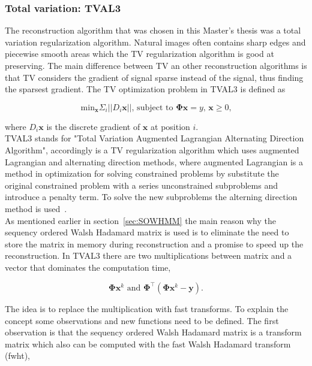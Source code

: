 \subsubsection{Total variation: TVAL3}
\label{sec:TV}
The reconstruction algorithm that was chosen in this Master's thesis was a total variation regularization algorithm. Natural images often contains sharp edges and piecewise smooth areas which the TV regularization algorithm is good at preserving. The main difference between TV an other reconstruction algorithms is that TV considers the gradient of signal sparse instead of the signal, thus finding the sparsest gradient. The TV optimization problem in TVAL3 is defined as  

\begin{equation}
\text{min}_\mathbf{x} \Sigma_i ||D_i \mathbf{x} || \text{, subject to } \mathbf{\Phi x} = 	y \text{, } \mathbf{x} \geq 0 \text{,} 
\end{equation}

where $D_i\mathbf{x}$ is the discrete gradient of $\mathbf{x}$ at position $i$.\\[0.1in]

TVAL3 stands for "Total Variation Augmented Lagrangian Alternating Direction Algorithm", accordingly is a TV regularization algorithm which uses augmented Lagrangian and alternating direction methods, where augmented Lagrangian is a method in optimization for solving constrained problems by substitute the original constrained problem with a series unconstrained subproblems and introduce a penalty term. To solve the new subproblems the alterning direction method is used~\cite{article:TVAL3}.\\[0.1in]

As mentioned earlier in section~\ref{sec:SOWHMM} the main reason why the sequency ordered Walsh Hadamard matrix is used is to eliminate the need to store the matrix in memory during reconstruction and a promise to speed up the reconstruction. In TVAL3 there are two multiplications between matrix and a vector that dominates the computation time,

\begin{equation}
\mathbf{\Phi}\mathbf{x}^k \text{ and } \mathbf{\Phi}^\top(\mathbf{\Phi}\mathbf{x}^k-\mathbf{y})\text{.}
\end{equation}

The idea is to replace the multiplication with fast transforms. To explain the concept some observations and new functions need to be defined. The first observation is that the sequency ordered Walsh Hadamard matrix is a transform matrix which also can be computed with the fast Walsh Hadamard transform (fwht),

